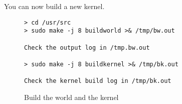 You can now build a new kernel.

\begin{figure}
  \centering
\begin{verbatim}
> cd /usr/src
> sudo make -j 8 buildworld >& /tmp/bw.out

Check the output log in /tmp.bw.out

> sudo make -j 8 buildkernel >& /tmp/bk.out

Check the kernel build log in /tmp/bk.out
\end{verbatim}
  \caption{Build the world and the kernel}
  \label{fig:utm-fbsd-build}
\end{figure}




